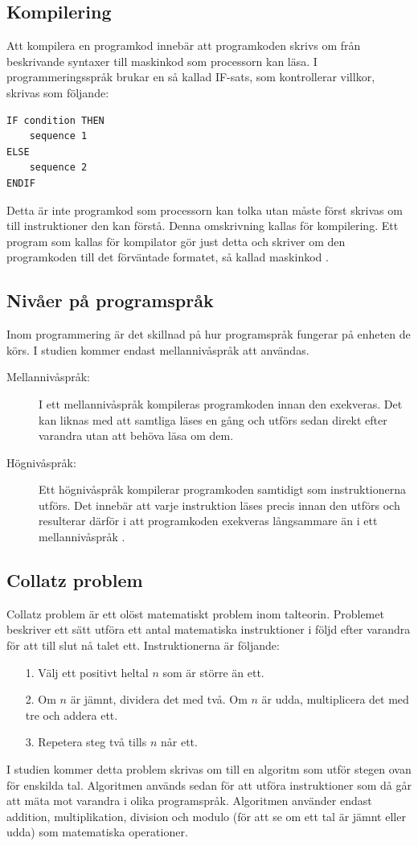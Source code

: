 \documentclass[12pt,swedish]{article}
\begin{document}
\subsection{Kompilering}
Att kompilera en programkod innebär att programkoden skrivs om från beskrivande syntaxer till maskinkod som processorn kan läsa. I programmeringsspråk brukar en så kallad IF-sats, som kontrollerar villkor, skrivas som följande:
\begin{lstlisting}
IF condition THEN
    sequence 1
ELSE
    sequence 2
ENDIF
\end{lstlisting}
Detta är inte programkod som processorn kan tolka utan måste först skrivas om till instruktioner den kan förstå. Denna omskrivning kallas för kompilering. Ett program som kallas för kompilator gör just detta och skriver om den programkoden till det förväntade formatet, så kallad maskinkod \citep{srikant_shankar_2008}.

\subsection{Nivåer på programspråk}
Inom programmering är det skillnad på hur programspråk fungerar på enheten de körs. I studien kommer endast mellannivåspråk att användas.
\begin{description}
    \item [Mellannivåspråk:] I ett mellannivåspråk kompileras programkoden innan den exekveras. Det kan liknas med att samtliga läses en gång och utförs sedan direkt efter varandra utan att behöva läsa om dem.
    \item [Högnivåspråk:] Ett högnivåspråk kompilerar programkoden samtidigt som instruktionerna utförs. Det innebär att varje instruktion läses precis innan den utförs och resulterar därför i att programkoden exekveras långsammare än i ett mellannivåspråk \citep{maclachlan_1992}.
\end{description}

\subsection{Collatz problem}
Collatz problem är ett olöst matematiskt problem inom talteorin. Problemet beskriver ett sätt utföra ett antal matematiska instruktioner i följd efter varandra för att till slut nå talet ett. Instruktionerna är följande:
\begin{enumerate}
    \item [1.] Välj ett positivt heltal \( n \) som är större än ett.
    \item [2.] Om \( n \) är jämnt, dividera det med två. Om \( n \) är udda, multiplicera det med tre och addera ett.
    \item [3.] Repetera steg två tills \( n \) når ett.
\end{enumerate}
I studien kommer detta problem skrivas om till en algoritm som utför stegen ovan för enskilda tal. Algoritmen används sedan för att utföra instruktioner som då går att mäta mot varandra i olika programspråk. Algoritmen använder endast addition, multiplikation, division och modulo (för att se om ett tal är jämnt eller udda) som matematiska operationer.
\end{document}

